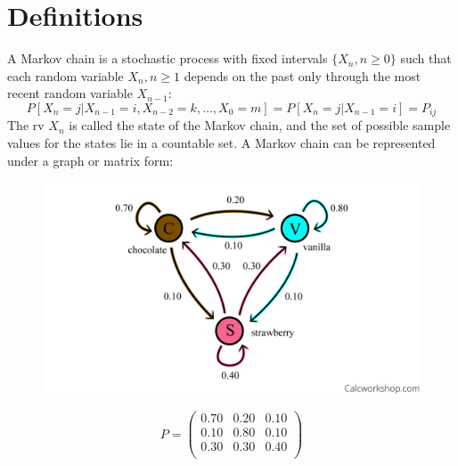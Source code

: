 \documentclass[12pt, openany]{report}
\theoremstyle{definition}
\begin{document}
\section{Definitions}
A Markov chain is a stochastic process with fixed intervals $\{X_n,n\ge 0\}$ such that each random variable $X_n,n\ge 1$ depends on the past only through the most recent random variable $X_{n-1}$:
\begin{equation}
	P[X_n=j|X_{n-1}=i, X_{n-2}=k,\dots,X_0=m] = P[X_n=j|X_{n-1}=i] = P_{ij}
\end{equation}
The rv $X_n$ is called the state of the Markov chain, and the set of possible sample values for the states lie in a countable set. A Markov chain can be represented under a graph or matrix form:\\
\begin{minipage}{.5\textwidth}
	\begin{figure}[H]
		\centering 
		\includegraphics[width=\textwidth]{img/markov_graph.png}
	\end{figure}
\end{minipage}
\begin{minipage}{.5\textwidth}
	\begin{equation}
		P = \begin{pmatrix}
		0.70 & 0.20 & 0.10 \\
		0.10 & 0.80 & 0.10 \\
		0.30 & 0.30 & 0.40 \\
		\end{pmatrix}
	\end{equation}
\end{minipage}
\end{document}
